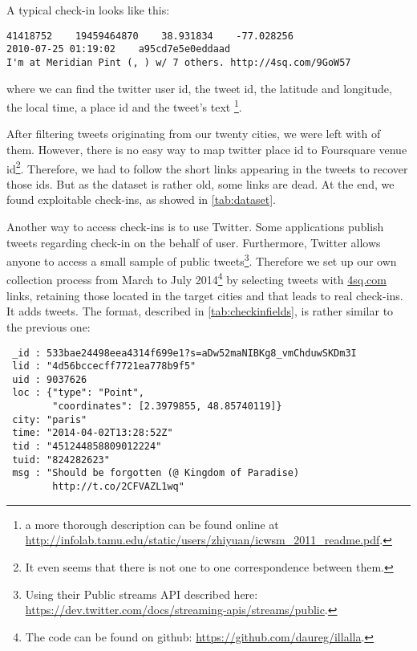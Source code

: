 A typical check-in looks like this:
\begin{verbatim}
41418752    19459464870    38.931834    -77.028256
2010-07-25 01:19:02    a95cd7e5e0eddaad
I'm at Meridian Pint (, ) w/ 7 others. http://4sq.com/9GoW57
\end{verbatim}

where we can find the twitter user id, the tweet id, the
latitude and longitude, the local time, a place id and the tweet's text
\footnote{a more thorough description can be found online
at \href{http://infolab.tamu.edu/static/users/zhiyuan/icwsm\_2011\_readme.pdf}%
{\url{http://infolab.tamu.edu/static/users/zhiyuan/icwsm\_2011\_readme.pdf}}.}.

After filtering tweets originating from our twenty cities, we were left with
 of them. However, there is no easy way to map twitter place
id to Foursquare venue id\footnote{It even seems that there is not one to one
correspondence between them.}. Therefore, we had to follow the short links
appearing in the tweets to recover those ids. But as the dataset is rather old,
some links are dead. At the end, we found  exploitable
check-ins, as showed in \autoref{tab:dataset}.

\medskip

Another way to access check-ins is to use Twitter. Some applications publish
tweets regarding check-in on the behalf of user. Furthermore, Twitter allows
anyone to access a small sample of public tweets\footnote{Using their Public
    streams API described here:
    \href{https://dev.twitter.com/docs/streaming-apis/streams/public}%
{\url{https://dev.twitter.com/docs/streaming-apis/streams/public}}.}.
 Therefore we set up our own
collection process from March to July 2014\footnote{The code can be found on
    github: \href{https://github.com/daureg/illalla}%
{\url{https://github.com/daureg/illalla}}.} by selecting tweets with
\url{4sq.com} links, retaining those located in the target cities and that
leads to real check-ins. It adds  tweets. The format,
described in \autoref{tab:checkinfields}, is rather similar to the previous
one:

\begin{verbatim}
 _id : 533bae24498eea4314f699e1?s=aDw52maNIBKg8_vmChduwSKDm3I
 lid : "4d56bccecff7721ea778b9f5"
 uid : 9037626
 loc : {"type": "Point",
        "coordinates": [2.3979855, 48.85740119]}
 city: "paris"
 time: "2014-04-02T13:28:52Z"
 tid : "451244858809012224"
 tuid: "824282623"
 msg : "Should be forgotten (@ Kingdom of Paradise)
        http://t.co/2CFVAZL1wq"
\end{verbatim}


